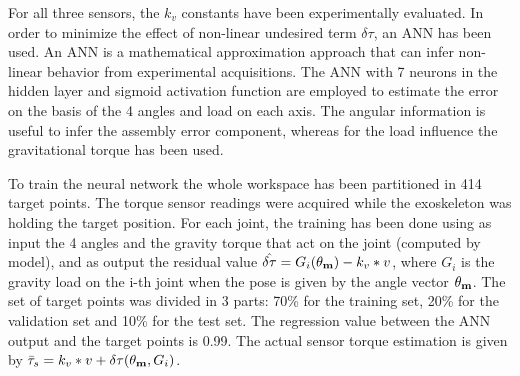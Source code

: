 %
%
%
For all three sensors, the $k_v$ constants have been experimentally evaluated. In order to minimize the effect of non-linear undesired term $\delta\tau$,  an ANN has been used. An ANN is a mathematical approximation approach that can infer non-linear behavior from experimental acquisitions. The ANN with 7 neurons in the hidden layer and sigmoid activation function are employed to estimate the error on the basis of the 4 angles and load on each axis. The angular information is useful to infer the assembly error component, whereas for the load influence the gravitational torque has been used. 
\par To train the neural network the whole workspace has been partitioned in 414 target points. The torque sensor readings were acquired while the exoskeleton was holding the target position. For each joint, the training has been done using as input the 4 angles and the gravity torque that act on the joint (computed by model), and as output the residual value $\hat{\delta\tau} = G_i(\mathbf{\theta_m}) - k_v * v$, where $G_i$ is the gravity load on the i-th joint when the pose is given by the angle vector $\mathbf{\theta_m}$. The set of target points was divided in 3 parts: 70\% for the training set, 20\% for the validation set and 10\% for the test set. The regression value between the ANN output and the target points is 0.99.
The actual sensor torque estimation is given by $\bar{\tau}_s = k_v * v + \delta\tau(\mathbf{\theta_m},G_i)$.%
